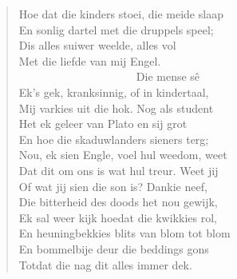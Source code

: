 \begin{verse}
Hoe dat die kinders stoei, die meide slaap \\ 
En sonlig dartel met die druppels speel; \\ 
Dis alles suiwer weelde, alles vol \\ 
Met die liefde van mij Engel. \\ 
\ \ \ \ \ \ \ \ \ \ \ \ \ \ \ \ \ \ \ \ \ Die mense sê \\ 
Ek’s gek, kranksinnig, of in kindertaal, \\ 
Mij varkies uit die hok. Nog als student \\ 
Het ek geleer van Plato en sij grot \\ 
En hoe die skaduwlanders sieners terg; \\ 
Nou, ek sien Engle, voel hul weedom, weet \\ 
Dat dit om ons is wat hul treur. Weet jij \\ 
Of wat jij sien die son is? Dankie neef, \\ 
Die bitterheid des doods het nou gewijk, \\ 
Ek sal weer kijk hoedat die kwikkies rol, \\ 
En heuningbekkies blits van blom tot blom \\ 
En bommelbije deur die beddings gons \\ 
Totdat die nag dit alles immer dek. \\ 
\end{verse}
